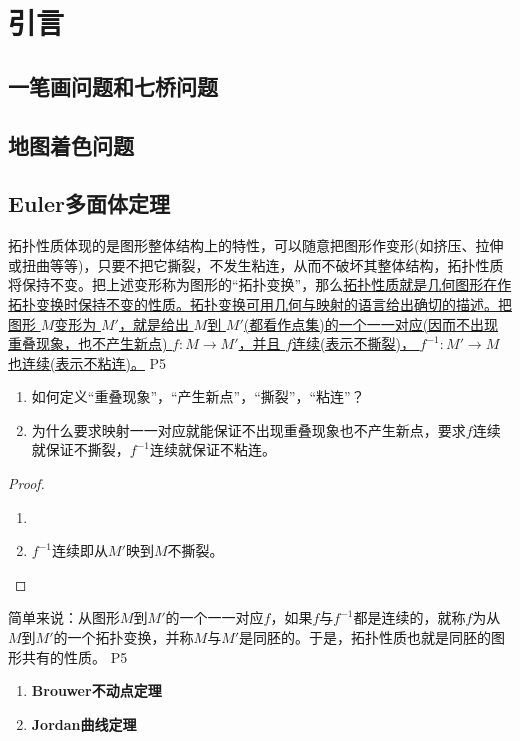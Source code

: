 \section*{引言}

\subsection*{一笔画问题和七桥问题}

\subsection*{地图着色问题}

\subsection*{Euler多面体定理}

\original
{
    拓扑性质体现的是图形整体结构上的特性，可以随意把图形作变形(如挤压、拉伸或扭曲等等)，只要不把它撕裂，不发生粘连，从而不破坏其整体结构，拓扑性质将保持不变。把上述变形称为图形的“拓扑变换”，那么\uline{拓扑性质就是几何图形在作拓扑变换时保持不变的性质。拓扑变换可用几何与映射的语言给出确切的描述。把图形 $M$变形为 $M'$，就是给出 $M$到 $M'$(都看作点集)的一个一一对应(因而不出现重叠现象，也不产生新点) $f:M\rightarrow M'$，并且 $f$连续(表示不撕裂)， $f^{-1}:M'\rightarrow M$也连续(表示不粘连)。}
}
{P5}

\begin{proposition}
    \begin{enumerate}
        \item 如何定义“重叠现象”，“产生新点”，“撕裂”，“粘连”？
        \item 为什么要求映射一一对应就能保证不出现重叠现象也不产生新点，要求$f$连续就保证不撕裂，$f^{-1}$连续就保证不粘连。
    \end{enumerate}
\end{proposition}

\begin{proof}
    \begin{enumerate}
        \item 
        \item $f^{-1}$连续即从$M'$映到$M$不撕裂。
    \end{enumerate}
\end{proof}

\original
{
    简单来说：从图形$M$到$M'$的一个一一对应$f$，如果$f$与$f^{-1}$都是连续的，就称$f$为从$M$到$M'$的一个拓扑变换，并称$M$与$M'$是同胚的。于是，拓扑性质也就是同胚的图形共有的性质。
}
{P5}

\begin{enumerate}
    \item \textbf{Brouwer不动点定理}
    \item \textbf{Jordan曲线定理}
\end{enumerate}
